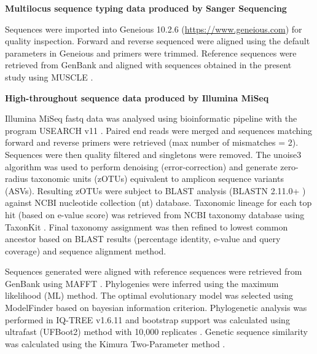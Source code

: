 \documentclass[a4paper, nobind]{templates/ociamthesis}
\begin{document}
\textbf{Multilocus sequence typing data produced by Sanger Sequencing}

Sequences were imported into Geneious 10.2.6 (\url{https://www.geneious.com}) for quality inspection.
Forward and reverse sequenced were aligned using the default parameters in Geneious and primers were trimmed.
Reference sequences were retrieved from GenBank \autocite{bensonGenBank2017} and aligned with sequences obtained in the present study using MUSCLE \autocite{edgarMUSCLEMultipleSequence2004}.

\textbf{High-throughout sequence data produced by Illumina MiSeq}

Illumina MiSeq fastq data was analysed using bioinformatic pipeline with the program USEARCH v11 \autocite{edgarSearchClusteringOrders2010}.
Paired end reads were merged and sequences matching forward and reverse primers were retrieved (max number of mismatches = 2).
Sequences were then quality filtered and singletons were removed.
The unoise3 \autocite{edgarUNOISE2ImprovedErrorcorrection2016} algorithm was used to perform denoising (error-correction) and generate zero-radius taxonomic units (zOTUs) equivalent to amplicon sequence variants (ASVs).
Resulting zOTUs were subject to BLAST analysis (BLASTN 2.11.0+ \autocite{zhangGreedyAlgorithmAligning2000,morgulisDatabaseIndexingProduction2008}) against NCBI nucleotide collection (nt) database.
Taxonomic lineage for each top hit (based on e-value score) was retrieved from NCBI taxonomy database using TaxonKit \autocite{weissHostReproductiveCycle2021}.
Final taxonomy assignment was then refined to lowest common ancestor based on BLAST results (percentage identity, e-value and query coverage) and sequence alignment method.

Sequences generated were aligned with reference sequences were retrieved from GenBank \autocite{bensonGenBank2017} using MAFFT \autocite{edgarMUSCLEMultipleSequence2004}.
Phylogenies were inferred using the maximum likelihood (ML) method.
The optimal evolutionary model was selected using ModelFinder \autocite{kalyaanamoorthyModelFinderFastModel2017} based on bayesian information criterion.
Phylogenetic analysis was performed in IQ-TREE v1.6.11 \autocite{nguyenIQTREEFastEffective2015} and bootstrap support was calculated using ultrafast (UFBoot2) method with 10,000 replicates \autocite{hoangUFBoot2ImprovingUltrafast2018}.
Genetic sequence similarity was calculated using the Kimura Two-Parameter method \autocite{tamuraEstimationNumberNucleotide1993}.

\newpage
\end{document}
